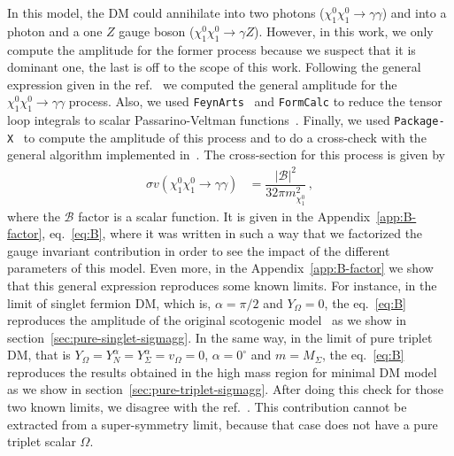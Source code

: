 \documentclass[12pt,letterpaper]{article}
\begin{document}
In this model, the DM could annihilate into two photons ($\chi_1^0\chi_1^0\rightarrow\gamma\gamma$) and into a photon and a one $Z$ gauge boson ($\chi_1^0\chi_1^0\rightarrow\gamma Z$). 
However, in this work, we only compute the amplitude for the former process because we suspect that it is dominant one, the last is off to the scope of this work.
%
Following the general expression given in the ref.~\cite{Garcia-Cely:2016hsk} we computed the general amplitude for the $\chi_1^0\chi_1^0\rightarrow\gamma\gamma$ process. 
Also, we used \texttt{FeynArts}~\cite{Hahn:2000kx} and \texttt{FormCalc} to reduce the tensor loop integrals to scalar Passarino-Veltman functions~\cite{Passarino:1978jh}. Finally, we used \texttt{Package-X}~\cite{Patel:2015tea} to compute the amplitude of this process and to do a cross-check with the general algorithm implemented in~\cite{Garcia-Cely:2016hsk}.
%
The cross-section for this process is given by
%
\begin{align}
\label{eq:sigmav-gg}
\sigma v (\chi^0_1\chi^0_1\rightarrow\gamma\gamma) &= \dfrac{|\mathcal{B}|^2}{32\pi m_{\chi^0_1}^2}\,,
\end{align}
%
where the $\mathcal{B}$ factor is a scalar function. It is given in the Appendix~\ref{app:B-factor}, eq.~\ref{eq:B}, where it was written in such a way that we factorized the gauge invariant contribution in order to see the impact of the different parameters of this model.
Even more, in the Appendix~\ref{app:B-factor} we show that this general expression reproduces some known limits. 
For instance, in the limit of singlet fermion DM, which is, $\alpha =\pi/2$ and $Y_{\Omega}=0$, the eq.~\ref{eq:B} reproduces the amplitude of the original scotogenic model~\cite{Garny:2015wea,Garcia-Cely:2016hsk} as we show in section~\ref{sec:pure-singlet-sigmagg}.
In the same way, in the limit of pure triplet DM, that is $Y_{\Omega}=Y_{N}^{\alpha}=Y_{\Sigma}^{\alpha}=v_{\Omega}=0$, $\alpha =0^{\circ}$ and $m=M_{\Sigma}$,  the eq.~\ref{eq:B} reproduces the results obtained in the high mass region for minimal DM model~\cite{Cirelli:2005uq} as we show in section~\ref{sec:pure-triplet-sigmagg}.
After doing this check for those two known limits, we disagree with the ref.~\cite{Choubey:2017yyn}. This contribution cannot be extracted from a super-symmetry limit, because that case does not have a pure triplet scalar $\Omega$.
\end{document}
